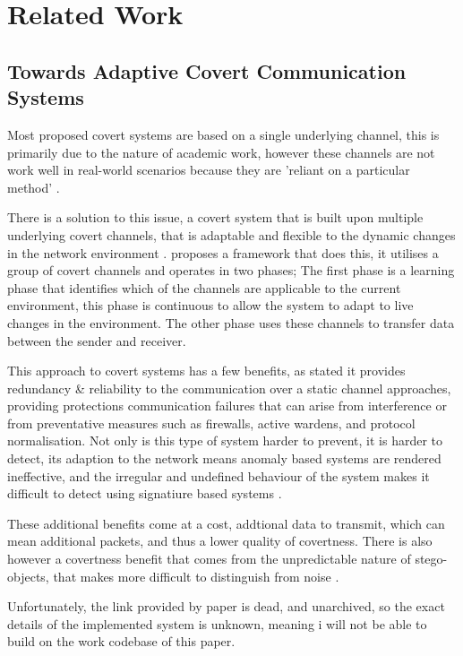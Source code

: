\chapter{Related Work}
\label{chap:related_work}

\section{Towards Adaptive Covert Communication Systems}

Most proposed covert systems are based on a single underlying channel, this is primarily due to the nature of academic work, however these channels are not work well in real-world scenarios because they are 'reliant on a particular method' \cite{TWACCS}.

There is a solution to this issue, a covert system that is built upon multiple underlying covert channels, that is adaptable and flexible to the dynamic changes in the network environment \cite{TWACCS}. \cite{TWACCS} proposes a framework that does this, it utilises a group of covert channels and operates in two phases; The first phase is a learning phase that identifies which of the channels are applicable to the current environment, this phase is continuous to allow the system to adapt to live changes in the environment. The other phase uses these channels to transfer data between the sender and receiver.

This approach to covert systems has a few benefits, as stated it provides redundancy \& reliability \cite{TWACCS} to the communication over a static channel approaches, providing protections communication failures that can arise from interference or from preventative measures such as firewalls, active wardens, and protocol normalisation. Not only is this type of system harder to prevent, it is harder to detect, its adaption to the network means anomaly based systems are rendered ineffective, and the irregular and undefined behaviour of the system makes it difficult to detect using signatiure based systems \cite{TWACCS}.

These additional benefits come at a cost, addtional data to transmit, which can mean additional packets, and thus a lower quality of covertness. There is also however a covertness benefit that comes from the unpredictable nature of stego-objects, that makes more difficult to distinguish from noise \cite{ECopSSUOCC}.

Unfortunately, the link provided by paper is dead, and unarchived, so the exact details of the implemented system is unknown, meaning i will not be able to build on the work codebase of this paper.

